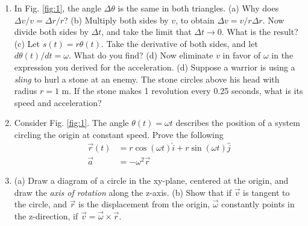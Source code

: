 \documentclass{article}
\begin{document}
\begin{enumerate}
\item In Fig. \ref{fig:1}, the angle $\Delta \theta$ is the same in both triangles. (a) Why does $\Delta v/v = \Delta r/r$? (b) Multiply both sides by $v$, to obtain $\Delta v = v/r\Delta r$.  Now divide both sides by $\Delta t$, and take the limit that $\Delta t \to 0$.  What is the result? (c) Let $s(t) = r\theta (t)$.  Take the derivative of both sides, and let $d\theta(t)/dt = \omega$.  What do you find? (d) Now eliminate $v$ in favor of $\omega$ in the expression you derived for the acceleration.  (d) Suppose a warrior is using a \textit{sling} to hurl a stone at an enemy.  The stone circles above his head with radius $r=1$ m.  If the stone makes 1 revolution every 0.25 seconds, what is its speed and acceleration? \\ \vspace{3.5cm}
\item Consider Fig. \ref{fig:1}.  The angle $\theta(t) = \omega t$ describes the position of a system circling the origin at constant speed.  Prove the following
\begin{align}
\vec{r}(t) &= r \cos(\omega t) \hat{i} + r \sin(\omega t) \hat{j} \\
\vec{a} &= -\omega^2 \vec{r}
\end{align} \vspace{1cm}
\item (a) Draw a diagram of a circle in the xy-plane, centered at the origin, and draw the \textit{axis of rotation} along the z-axis. (b) Show that if $\vec{v}$ is tangent to the circle, and $\vec{r}$ is the displacement from the origin, $\vec{\omega}$ constantly points in the z-direction, if $\vec{v} = \vec{\omega} \times \vec{r}$.
\end{enumerate}
\end{document}
